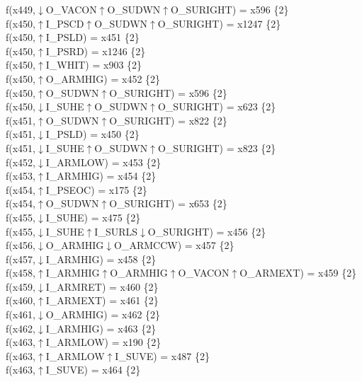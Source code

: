 f(x449,$\downarrow$O\_VACON$\uparrow$O\_SUDWN$\uparrow$O\_SURIGHT) = x596 \{2\} \\  
f(x450,$\uparrow$I\_PSCD$\uparrow$O\_SUDWN$\uparrow$O\_SURIGHT) = x1247 \{2\} \\  
f(x450,$\uparrow$I\_PSLD) = x451 \{2\} \\  
f(x450,$\uparrow$I\_PSRD) = x1246 \{2\} \\  
f(x450,$\uparrow$I\_WHIT) = x903 \{2\} \\  
f(x450,$\uparrow$O\_ARMHIG) = x452 \{2\} \\  
f(x450,$\uparrow$O\_SUDWN$\uparrow$O\_SURIGHT) = x596 \{2\} \\  
f(x450,$\downarrow$I\_SUHE$\uparrow$O\_SUDWN$\uparrow$O\_SURIGHT) = x623 \{2\} \\  
f(x451,$\uparrow$O\_SUDWN$\uparrow$O\_SURIGHT) = x822 \{2\} \\  
f(x451,$\downarrow$I\_PSLD) = x450 \{2\} \\  
f(x451,$\downarrow$I\_SUHE$\uparrow$O\_SUDWN$\uparrow$O\_SURIGHT) = x823 \{2\} \\  
f(x452,$\downarrow$I\_ARMLOW) = x453 \{2\} \\  
f(x453,$\uparrow$I\_ARMHIG) = x454 \{2\} \\  
f(x454,$\uparrow$I\_PSEOC) = x175 \{2\} \\  
f(x454,$\uparrow$O\_SUDWN$\uparrow$O\_SURIGHT) = x653 \{2\} \\  
f(x455,$\downarrow$I\_SUHE) = x475 \{2\} \\  
f(x455,$\downarrow$I\_SUHE$\uparrow$I\_SURLS$\downarrow$O\_SURIGHT) = x456 \{2\} \\  
f(x456,$\downarrow$O\_ARMHIG$\downarrow$O\_ARMCCW) = x457 \{2\} \\  
f(x457,$\downarrow$I\_ARMHIG) = x458 \{2\} \\  
f(x458,$\uparrow$I\_ARMHIG$\uparrow$O\_ARMHIG$\uparrow$O\_VACON$\uparrow$O\_ARMEXT) = x459 \{2\} \\  
f(x459,$\downarrow$I\_ARMRET) = x460 \{2\} \\  
f(x460,$\uparrow$I\_ARMEXT) = x461 \{2\} \\  
f(x461,$\downarrow$O\_ARMHIG) = x462 \{2\} \\  
f(x462,$\downarrow$I\_ARMHIG) = x463 \{2\} \\  
f(x463,$\uparrow$I\_ARMLOW) = x190 \{2\} \\  
f(x463,$\uparrow$I\_ARMLOW$\uparrow$I\_SUVE) = x487 \{2\} \\  
f(x463,$\uparrow$I\_SUVE) = x464 \{2\} \\  
